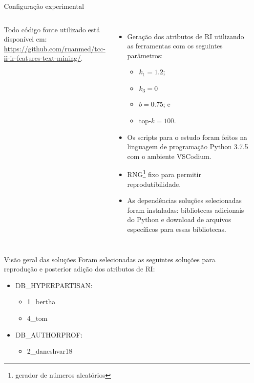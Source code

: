 \documentclass[%
  10pt,%
  aspectratio = 169,%
  compress,%
  t,%
]{beamer}%
\begin{document}
    \begin{frame}{}{Configuração experimental}
        \begin{columns}[T]
                \centering
                

                \raggedright
                Todo código fonte utilizado está disponível em: \hyperlink{https://github.com/ruanmed/tcc-ii-ir-features-text-mining/}{https://github.com/ruanmed/tcc-ii-ir-features-text-mining/}.
                \begin{itemize}
                    \item Geração dos atributos de RI utilizando as ferramentas com os seguintes parâmetros:
                    \begin{itemize}
                        \vspace{-0.5cm}
                        \item $k_1 = 1.2$;
                        \item $k_3 = 0$
                        \item $b = 0.75$; e
                        \item $\text{top-}k = 100$.
                    \end{itemize}
                    \item Os scripts para o estudo foram feitos na linguagem de programação Python 3.7.5 com o ambiente VSCodium.

                    \item RNG\footnote{gerador de números aleatórios} fixo para permitir reprodutibilidade.

                    \item As dependências soluções selecionadas foram instaladas: bibliotecas adicionais do Python e download de arquivos específicos para essas bibliotecas.
                \end{itemize}
        \end{columns}
    \end{frame}

    \begin{frame}{}{Visão geral das soluções}
            Foram selecionadas as seguintes soluções para reprodução e posterior adição dos atributos de RI:
            \begin{itemize}
                \item DB\_HYPERPARTISAN:
                    \begin{itemize}
                        \item 1\_bertha
                        \item 4\_tom
                    \end{itemize}
                \item DB\_AUTHORPROF:
                    \begin{itemize}
                        \item 2\_daneshvar18
                    \end{itemize}
            \end{itemize}
    \end{frame}
\end{document}
